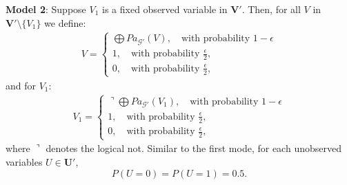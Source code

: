 \documentclass[accepted]{uai2022}
\newcommand{\Pa}[2]{\textit{Pa}_{#2}(#1)}
\newcommand{\V}[0]{\mathbf{V}}
\newcommand{\U}[0]{\mathbf{U}}
\newcommand{\G}[0]{\mathcal{G}}
\begin{document}
    \textbf{Model 2}: Suppose $V_1$ is a fixed observed variable in $\V'$. 
    Then, for all $V$ in $\V'\setminus \{V_1\}$ we define:
    \begin{align}
        V = 
        \begin{cases}
            \bigoplus \Pa{V}{\G'}, \quad \text{with probability } 1-\epsilon \\
            1, \quad \text{with probability } \frac{\epsilon}{2},\\
            0, \quad \text{with probability } \frac{\epsilon}{2},
        \end{cases}
    \end{align}
    and for $V_1$:
    \begin{align}
        V_1 = 
        \begin{cases}
            \urcorner\bigoplus \Pa{V_1}{\G'}, \quad \text{with probability } 1-\epsilon \\
            1, \quad \text{with probability } \frac{\epsilon}{2},\\
            0, \quad \text{with probability } \frac{\epsilon}{2},
        \end{cases}
    \end{align}
    where $\urcorner$ denotes the logical not. 
    Similar to the first mode, for each unobserved variables $U\in\U'$, 
    \begin{equation*}
        P(U=0)= P(U=1) = 0.5.
    \end{equation*}
    
\end{document}
